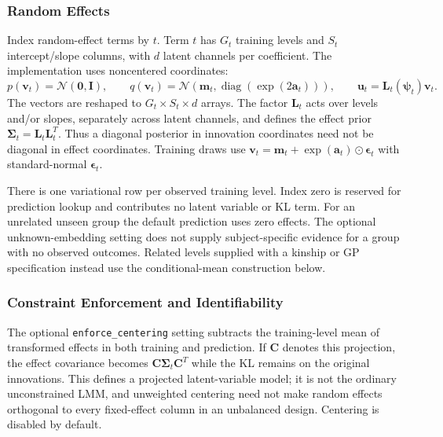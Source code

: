 \documentclass[12pt,a4paper]{article}
\newcommand{\N}{\mathcal{N}}
\begin{document}
\subsubsection{Random Effects}

Index random-effect terms by $t$. Term $t$ has $G_t$ training levels and $S_t$ intercept/slope columns, with $d$ latent channels per coefficient. The implementation uses noncentered coordinates:
\begin{equation}
 p(\mathbf{v}_t)=\N(\mathbf{0},\mathbf{I}),\qquad
 q(\mathbf{v}_t)=\N(\mathbf{m}_t,\operatorname{diag}(\exp(2\mathbf{a}_t))),\qquad
 \mathbf{u}_t=\mathbf{L}_t(\boldsymbol\psi_t)\mathbf{v}_t.
\end{equation}
The vectors are reshaped to $G_t\times S_t\times d$ arrays. The factor $\mathbf{L}_t$ acts over levels and/or slopes, separately across latent channels, and defines the effect prior $\mathbf{\Sigma}_t=\mathbf{L}_t\mathbf{L}_t^T$. Thus a diagonal posterior in innovation coordinates need not be diagonal in effect coordinates. Training draws use $\mathbf{v}_t=\mathbf{m}_t+\exp(\mathbf{a}_t)\odot\boldsymbol\epsilon_t$ with standard-normal $\boldsymbol\epsilon_t$.

There is one variational row per observed training level. Index zero is reserved for prediction lookup and contributes no latent variable or KL term. For an unrelated unseen group the default prediction uses zero effects. The optional unknown-embedding setting does not supply subject-specific evidence for a group with no observed outcomes. Related levels supplied with a kinship or GP specification instead use the conditional-mean construction below.

\subsubsection{Constraint Enforcement and Identifiability}

The optional \texttt{enforce\_centering} setting subtracts the training-level mean of transformed effects in both training and prediction. If $\mathbf C$ denotes this projection, the effect covariance becomes $\mathbf C\mathbf\Sigma_t\mathbf C^T$ while the KL remains on the original innovations. This defines a projected latent-variable model; it is not the ordinary unconstrained LMM, and unweighted centering need not make random effects orthogonal to every fixed-effect column in an unbalanced design. Centering is disabled by default.
\end{document}
